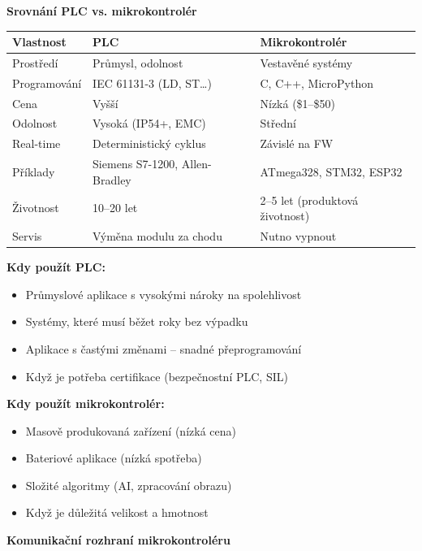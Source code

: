 \documentclass[a4paper,10pt]{article}
\begin{document}
\begin{vysvetlenibox}
\textbf{Srovnání PLC vs. mikrokontrolér}

\begin{center}
\begin{tabularx}{0.95\linewidth}{@{} l X X @{}}
    \toprule
    \textbf{Vlastnost} & \textbf{PLC} & \textbf{Mikrokontrolér} \\
    \midrule
    Prostředí        & Průmysl, odolnost & Vestavěné systémy \\
    Programování     & IEC 61131-3 (LD, ST\ldots) & C, C++, MicroPython \\
    Cena             & Vyšší & Nízká (\$1--\$50) \\
    Odolnost         & Vysoká (IP54+, EMC) & Střední \\
    Real-time        & Deterministický cyklus & Závislé na FW \\
    Příklady         & Siemens S7-1200, Allen-Bradley & ATmega328, STM32, ESP32 \\
    Životnost        & 10--20 let & 2--5 let (produktová životnost) \\
    Servis           & Výměna modulu za chodu & Nutno vypnout \\
    \bottomrule
\end{tabularx}
\end{center}

\textbf{Kdy použít PLC:}
\begin{itemize}[noitemsep, leftmargin=1.4em, topsep=4pt]
    \item Průmyslové aplikace s vysokými nároky na spolehlivost
    \item Systémy, které musí běžet roky bez výpadku
    \item Aplikace s častými změnami -- snadné přeprogramování
    \item Když je potřeba certifikace (bezpečnostní PLC, SIL)
\end{itemize}

\textbf{Kdy použít mikrokontrolér:}
\begin{itemize}[noitemsep, leftmargin=1.4em, topsep=4pt]
    \item Masově produkovaná zařízení (nízká cena)
    \item Bateriové aplikace (nízká spotřeba)
    \item Složité algoritmy (AI, zpracování obrazu)
    \item Když je důležitá velikost a hmotnost
\end{itemize}

\textbf{Komunikační rozhraní mikrokontroléru}


\end{vysvetlenibox}
\end{document}
